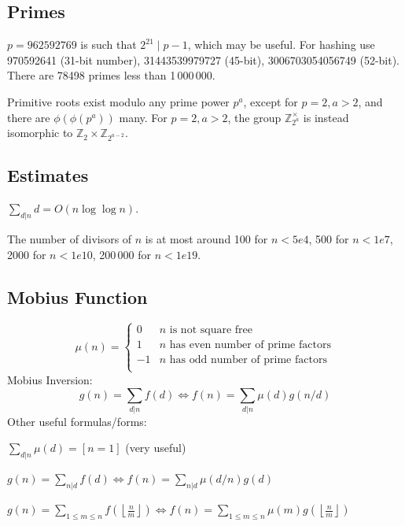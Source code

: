\subsection{Primes}
	$p=962592769$ is such that $2^{21} \mid p-1$, which may be useful. For hashing
	use 970592641 (31-bit number), 31443539979727 (45-bit), 3006703054056749
	(52-bit). There are 78498 primes less than 1\,000\,000.

	Primitive roots exist modulo any prime power $p^a$, except for $p = 2, a > 2$, and there are $\phi(\phi(p^a))$ many.
	For $p = 2, a > 2$, the group $\mathbb Z_{2^a}^\times$ is instead isomorphic to $\mathbb Z_2 \times \mathbb Z_{2^{a-2}}$.

\subsection{Estimates}
	$\sum_{d|n} d = O(n \log \log n)$.

	The number of divisors of $n$ is at most around 100 for $n < 5e4$, 500 for $n < 1e7$, 2000 for $n < 1e10$, 200\,000 for $n < 1e19$.

\subsection{Mobius Function}
\[
	\mu(n) = \begin{cases} 0 & n \textrm{ is not square free}\\ 1 & n \textrm{ has even number of prime factors}\\ -1 & n \textrm{ has odd number of prime factors}\\\end{cases}
\]
  Mobius Inversion:
  \[ g(n) = \sum_{d|n} f(d) \Leftrightarrow f(n) = \sum_{d|n} \mu(d)g(n/d) \]
  Other useful formulas/forms:

  $ \sum_{d | n} \mu(d) = [ n = 1] $ (very useful)

  $ g(n) = \sum_{n|d} f(d) \Leftrightarrow f(n) = \sum_{n|d} \mu(d/n)g(d)$

 $ g(n) = \sum_{1 \leq m \leq n} f(\left\lfloor\frac{n}{m}\right \rfloor ) \Leftrightarrow f(n) = \sum_{1\leq m\leq n} \mu(m)g(\left\lfloor\frac{n}{m}\right\rfloor)$
